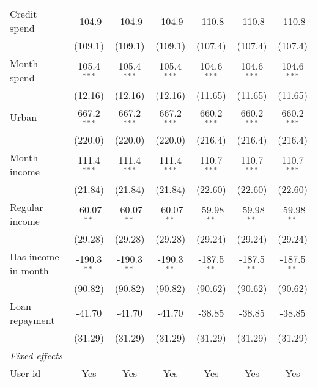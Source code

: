\begin{table}[htbp]
\begin{threeparttable}[b]
\begin{tabular}{lcccccc}
         Credit spend            & -104.9        & -104.9        & -104.9        & -110.8        & -110.8        & -110.8\\   
                                 & (109.1)       & (109.1)       & (109.1)       & (107.4)       & (107.4)       & (107.4)\\   
         Month spend             & 105.4$^{***}$ & 105.4$^{***}$ & 105.4$^{***}$ & 104.6$^{***}$ & 104.6$^{***}$ & 104.6$^{***}$\\   
                                 & (12.16)       & (12.16)       & (12.16)       & (11.65)       & (11.65)       & (11.65)\\   
         Urban                   & 667.2$^{***}$ & 667.2$^{***}$ & 667.2$^{***}$ & 660.2$^{***}$ & 660.2$^{***}$ & 660.2$^{***}$\\   
                                 & (220.0)       & (220.0)       & (220.0)       & (216.4)       & (216.4)       & (216.4)\\   
         Month income            & 111.4$^{***}$ & 111.4$^{***}$ & 111.4$^{***}$ & 110.7$^{***}$ & 110.7$^{***}$ & 110.7$^{***}$\\   
                                 & (21.84)       & (21.84)       & (21.84)       & (22.60)       & (22.60)       & (22.60)\\   
         Regular income          & -60.07$^{**}$ & -60.07$^{**}$ & -60.07$^{**}$ & -59.98$^{**}$ & -59.98$^{**}$ & -59.98$^{**}$\\   
                                 & (29.28)       & (29.28)       & (29.28)       & (29.24)       & (29.24)       & (29.24)\\   
         Has income in month     & -190.3$^{**}$ & -190.3$^{**}$ & -190.3$^{**}$ & -187.5$^{**}$ & -187.5$^{**}$ & -187.5$^{**}$\\   
                                 & (90.82)       & (90.82)       & (90.82)       & (90.62)       & (90.62)       & (90.62)\\   
         Loan repayment          & -41.70        & -41.70        & -41.70        & -38.85        & -38.85        & -38.85\\   
                                 & (31.29)       & (31.29)       & (31.29)       & (31.29)       & (31.29)       & (31.29)\\   
         \midrule
         \emph{Fixed-effects}\\
         User id                 & Yes           & Yes           & Yes           & Yes           & Yes           & Yes\\  

\end{tabular}
\end{threeparttable}
\end{table}
